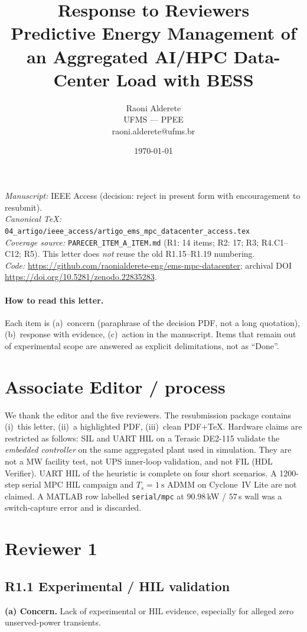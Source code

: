 \documentclass[11pt]{article}
\title{Response to Reviewers\\[0.4em]
\large Predictive Energy Management of an Aggregated AI/HPC Data-Center Load with BESS}
\author{Raoni Alderete\\UFMS --- PPEE\\raoni.alderete@ufms.br}
\date{\today}
\newcommand{\repgithub}{https://github.com/raonialderete-eng/ems-mpc-datacenter}
\newcommand{\repzenodo}{10.5281/zenodo.22835283}
\begin{document}
\maketitle

\noindent\textit{Manuscript:} IEEE Access (decision: reject in present form with encouragement to resubmit).\\
\textit{Canonical TeX:} \texttt{04\_artigo/ieee\_access/artigo\_ems\_mpc\_datacenter\_access.tex}\\
\textit{Coverage source:} \texttt{PARECER\_ITEM\_A\_ITEM.md} (R1: 14 items; R2: 17; R3; R4.C1--C12; R5). This letter does \emph{not} reuse the old R1.15--R1.19 numbering.\\
\textit{Code:} \url{\repgithub}; archival DOI \url{https://doi.org/\repzenodo}.

\paragraph{How to read this letter.}
Each item is (a)~concern (paraphrase of the decision PDF, not a long quotation), (b)~response with evidence, (c)~action in the manuscript. Items that remain out of experimental scope are answered as explicit delimitations, not as ``Done''.

\section*{Associate Editor / process}

We thank the editor and the five reviewers. The resubmission package contains (i)~this letter, (ii)~a highlighted PDF, (iii)~clean PDF+TeX. Hardware claims are restricted as follows: SIL and UART HIL on a Terasic DE2-115 validate the \emph{embedded controller} on the same aggregated plant used in simulation. They are not a MW facility test, not UPS inner-loop validation, and not FIL (HDL Verifier). UART HIL of the heuristic is complete on four short scenarios. A 1200-step serial MPC HIL campaign and $T_s=\SI{1}{\second}$ ADMM on Cyclone~IV Lite are not claimed. A MATLAB row labelled \texttt{serial/mpc} at $90.98$\,kW / $57$\,s wall was a switch-capture error and is discarded.

\section*{Reviewer 1}

\subsection*{R1.1 Experimental / HIL validation}
\textbf{(a) Concern.} Lack of experimental or HIL evidence, especially for alleged zero unserved-power transients.
\end{document}
